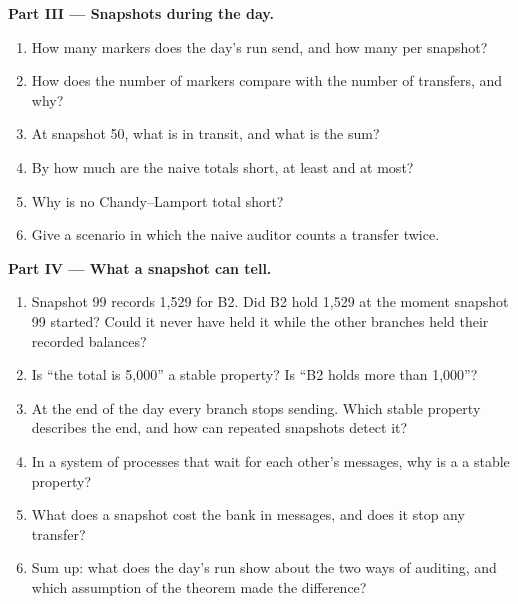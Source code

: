 \begin{problem}
\medskip\noindent\textbf{Part III --- Snapshots during the day.}
\begin{enumerate}[resume]
  \item How many markers does the day's run send, and how many per snapshot?
  \item How does the number of markers compare with the number of transfers, and why?
  \item At snapshot 50, what is in transit, and what is the sum?
  \item By how much are the naive totals short, at least and at most?
  \item Why is no Chandy--Lamport total short?
  \item Give a scenario in which the naive auditor counts a transfer twice.
\end{enumerate}

\medskip\noindent\textbf{Part IV --- What a snapshot can tell.}
\begin{enumerate}[resume]
  \item Snapshot 99 records 1,529 for B2. Did B2 hold 1,529 at the moment snapshot 99 started? Could it never have held it while the other branches held their recorded balances?
  \item Is ``the total is 5,000'' a stable property? Is ``B2 holds more than 1,000''?
  \item At the end of the day every branch stops sending. Which stable property describes the end, and how can repeated snapshots detect it?
  \item In a system of processes that wait for each other's messages, why is a  a stable property?
  \item What does a snapshot cost the bank in messages, and does it stop any transfer?
  \item Sum up: what does the day's run show about the two ways of auditing, and which assumption of the theorem made the difference?
\end{enumerate}
\end{problem}
